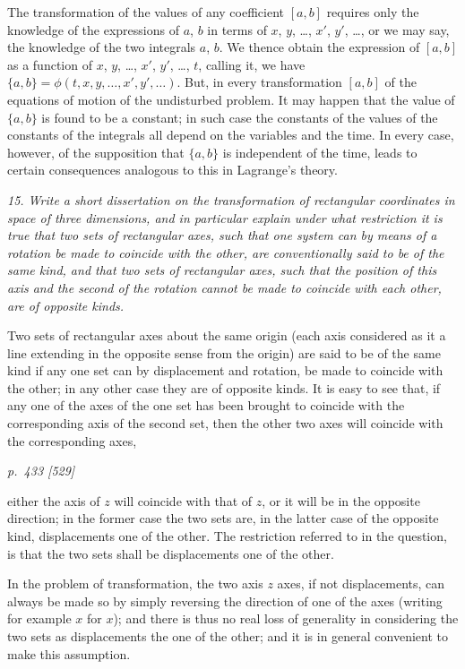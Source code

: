 \documentclass[11pt,a4paper]{article}
\theoremstyle{plain}
\theoremstyle{definition}
\begin{document}
The transformation of the values of any coefficient $[a, b]$ requires only the knowledge of
the expressions of $a$, $b$ in terms of $x$, $y$, \ldots, $x'$, $y'$, \ldots, or we may say, the knowledge of the two
integrals $a$, $b$. We thence obtain the expression of $[a, b]$ as a function of $x$, $y$, \ldots, $x'$, $y'$, \ldots,
$t$, calling it, we have $\{a, b\} = \phi(t, x, y, \ldots, x', y', \ldots)$. But, in every transformation $[a, b]$ of the
equations of motion of the undisturbed problem. It may happen that the value of
$\{a, b\}$ is found to be a constant; in such case the constants of the values of the constants
of the integrals all depend on the variables and the time. In every case, however,
of the supposition that $\{a, b\}$ is independent of the time, leads to certain consequences
analogous to this in Lagrange's theory.

\textit{15. Write a short dissertation on the transformation of rectangular coordinates in
space of three dimensions, and in particular explain under what restriction it is true
that two sets of rectangular axes, such that one system can by means of a rotation be
made to coincide with the other, are conventionally said to be of the same kind, and that
two sets of rectangular axes, such that the position of this axis and the second of the
rotation cannot be made to coincide with each other, are of opposite kinds.}

Two sets of rectangular axes about the same origin (each axis considered as it
a line extending in the opposite sense from the origin) are said to be of the same
kind if any one set can by displacement and rotation, be made to coincide with the
other; in any other case they are of opposite kinds. It is easy to see that, if any one
of the axes of the one set has been brought to coincide with the corresponding axis
of the second set, then the other two axes will coincide with the corresponding axes,

\clearpage

\bigskip
\textit{p.~433 [529]}
\smallskip

\noindent
either the axis of $z$ will coincide with that of $z$, or it will be in the opposite
direction; in the former case the two sets are, in the latter case of the opposite kind,
displacements one of the other. The restriction referred to in the question, is that
the two sets shall be displacements one of the other.

In the problem of transformation, the two axis $z$ axes, if not displacements, can
always be made so by simply reversing the direction of one of the axes (writing for
example $x$ for $x$); and there is thus no real loss of generality in considering the
two sets as displacements the one of the other; and it is in general convenient to
make this assumption.
\end{document}

